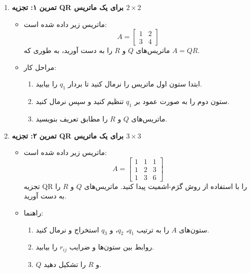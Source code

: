 \begin{enumerate}
	\item \textbf{تمرین ۱: تجزیه QR برای یک ماتریس \( 2 \times 2 \)}
	\begin{itemize}
		\item ماتریس زیر داده شده است:
		\[
		A = \begin{bmatrix}
			1 & 2 \\
			3 & 4
		\end{bmatrix}
		\]
		ماتریس‌های \( Q \) و \( R \) را به دست آورید، به طوری که \( A = QR \).
		
		\item مراحل کار:
		\begin{enumerate}
			\item ابتدا ستون اول ماتریس را نرمال کنید تا بردار \( q_1 \) را بیابید.
			\item ستون دوم را به صورت عمود بر \( q_1 \) تنظیم کنید و سپس نرمال کنید.
			\item ماتریس‌های \( Q \) و \( R \) را مطابق تعریف بنویسید.
		\end{enumerate}
	\end{itemize}
	
	\item \textbf{تمرین ۲: تجزیه QR برای یک ماتریس \( 3 \times 3 \)}
	\begin{itemize}
		\item ماتریس زیر داده شده است:
		\[
		A = \begin{bmatrix}
			1 & 1 & 1 \\
			1 & 2 & 3 \\
			1 & 3 & 6
		\end{bmatrix}
		\]
		تجزیه QR را با استفاده از روش گرَم-اشمیت پیدا کنید. ماتریس‌های \( Q \) و \( R \) را به دست آورید.
		
		\item راهنما:
		\begin{enumerate}
			\item ستون‌های \( A \) را به ترتیب \( q_1 \)، \( q_2 \)، و \( q_3 \) استخراج و نرمال کنید.
			\item روابط بین ستون‌ها و ضرایب \( r_{ij} \) را بیابید.
			\item \( Q \) و \( R \) را تشکیل دهید.
		\end{enumerate}
	\end{itemize}
	

\end{enumerate}
